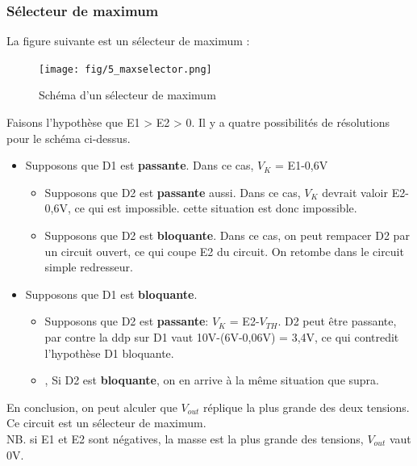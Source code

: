 \documentclass[a4paper]{article}
\begin{document}
    \subsubsection{Sélecteur de maximum}
    La figure suivante est un sélecteur de maximum :
    \begin{figure}[H]
        \begin{center}
            \texttt{[image: fig/5\_maxselector.png]}
            \caption{Schéma d'un sélecteur de maximum}
            \label{fig:5_maxselector}
        \end{center}
    \end{figure}

    Faisons l'hypothèse que E1 > E2 > 0.
    Il y a quatre possibilités de résolutions pour le schéma ci-dessus.

    \begin{itemize}
        \item Supposons que D1 est \textbf{passante}. Dans ce cas, $V_K$ = E1-0,6V
        \begin{itemize}
            \item Supposons que D2 est \textbf{passante} aussi. Dans ce cas, $V_K$ devrait
            valoir E2-0,6V, ce qui est impossible. cette situation est donc impossible.
            \item Supposons que D2 est \textbf{bloquante}. Dans ce cas, on peut
            rempacer D2 par un circuit ouvert, ce qui coupe E2 du circuit. On 
            retombe dans le circuit simple redresseur.
        \end{itemize}
        \item Supposons que D1 est \textbf{bloquante}.
        \begin{itemize}
            \item Supposons que D2 est \textbf{passante}: $V_K$ = E2-$V_{TH}$. 
            D2 peut être passante, par contre la ddp sur D1 vaut 10V-(6V-0,06V) = 3,4V,
            ce qui contredit l'hypothèse D1 bloquante.
            \item, Si D2 est \textbf{bloquante}, on en arrive à la même situation
            que supra.
        \end{itemize}
    \end{itemize}
    En conclusion, on peut alculer que $V_{out}$ réplique la plus grande des deux
    tensions. Ce circuit est un sélecteur de maximum.\\

    NB. si E1 et E2 sont négatives, la masse est la plus grande des tensions, 
    $V_{out}$ vaut 0V.
\end{document}
